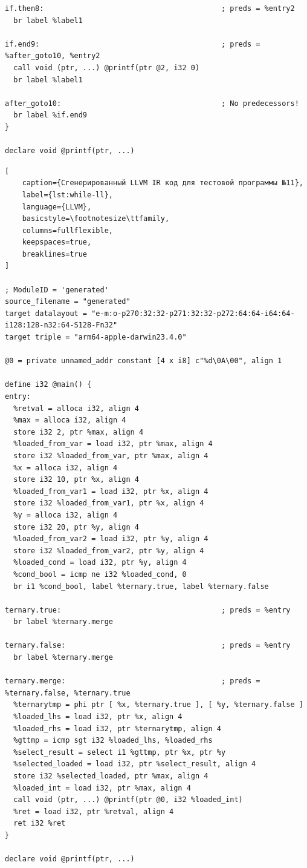 \begin{lstlisting}
if.then8:                                         ; preds = %entry2
  br label %label1

if.end9:                                          ; preds = %after_goto10, %entry2
  call void (ptr, ...) @printf(ptr @2, i32 0)
  br label %label1

after_goto10:                                     ; No predecessors!
  br label %if.end9
}

declare void @printf(ptr, ...)

\end{lstlisting}


\begin{lstlisting}[
    caption={Сгенерированный LLVM IR код для тестовой программы №11},
    label={lst:while-ll},
    language={LLVM},
    basicstyle=\footnotesize\ttfamily,
    columns=fullflexible,
    keepspaces=true,
    breaklines=true
]

; ModuleID = 'generated'
source_filename = "generated"
target datalayout = "e-m:o-p270:32:32-p271:32:32-p272:64:64-i64:64-i128:128-n32:64-S128-Fn32"
target triple = "arm64-apple-darwin23.4.0"

@0 = private unnamed_addr constant [4 x i8] c"%d\0A\00", align 1

define i32 @main() {
entry:
  %retval = alloca i32, align 4
  %max = alloca i32, align 4
  store i32 2, ptr %max, align 4
  %loaded_from_var = load i32, ptr %max, align 4
  store i32 %loaded_from_var, ptr %max, align 4
  %x = alloca i32, align 4
  store i32 10, ptr %x, align 4
  %loaded_from_var1 = load i32, ptr %x, align 4
  store i32 %loaded_from_var1, ptr %x, align 4
  %y = alloca i32, align 4
  store i32 20, ptr %y, align 4
  %loaded_from_var2 = load i32, ptr %y, align 4
  store i32 %loaded_from_var2, ptr %y, align 4
  %loaded_cond = load i32, ptr %y, align 4
  %cond_bool = icmp ne i32 %loaded_cond, 0
  br i1 %cond_bool, label %ternary.true, label %ternary.false

ternary.true:                                     ; preds = %entry
  br label %ternary.merge

ternary.false:                                    ; preds = %entry
  br label %ternary.merge

ternary.merge:                                    ; preds = %ternary.false, %ternary.true
  %ternarytmp = phi ptr [ %x, %ternary.true ], [ %y, %ternary.false ]
  %loaded_lhs = load i32, ptr %x, align 4
  %loaded_rhs = load i32, ptr %ternarytmp, align 4
  %gttmp = icmp sgt i32 %loaded_lhs, %loaded_rhs
  %select_result = select i1 %gttmp, ptr %x, ptr %y
  %selected_loaded = load i32, ptr %select_result, align 4
  store i32 %selected_loaded, ptr %max, align 4
  %loaded_int = load i32, ptr %max, align 4
  call void (ptr, ...) @printf(ptr @0, i32 %loaded_int)
  %ret = load i32, ptr %retval, align 4
  ret i32 %ret
}

declare void @printf(ptr, ...)

\end{lstlisting}



